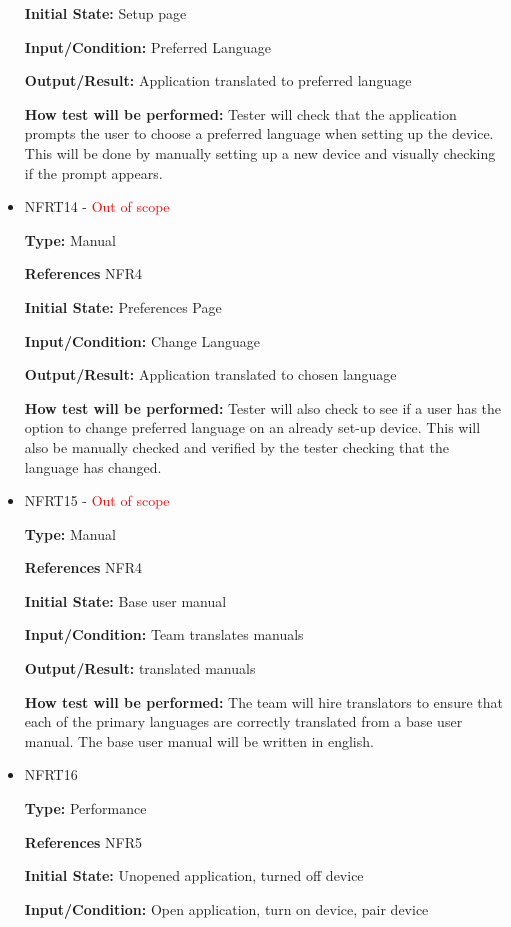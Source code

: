 \documentclass[12pt, titlepage]{article}
\begin{document}
\begin{itemize}
\textbf{Initial State:} Setup page
					
\textbf{Input/Condition:} Preferred Language
					
\textbf{Output/Result:} Application translated to preferred language
					
\textbf{How test will be performed:} Tester will check that the application prompts the user to choose a preferred language when setting up the device. This will be done by manually setting up a new device and visually checking if the prompt appears.

\item{NFRT14 - \textcolor{red}{Out of scope}}

\textbf{Type:} Manual

\textbf{References} NFR4
					
\textbf{Initial State:} Preferences Page
					
\textbf{Input/Condition:} Change Language
					
\textbf{Output/Result:} Application translated to chosen language
					
\textbf{How test will be performed:} Tester will also check to see if a user has the option to change preferred language on an already set-up device. This will also be manually checked and verified by the tester checking that the language has changed.

\item{NFRT15 - \textcolor{red}{Out of scope}} 

\textbf{Type:} Manual

\textbf{References} NFR4
					
\textbf{Initial State:} Base user manual  
					
\textbf{Input/Condition:} Team translates manuals
					
\textbf{Output/Result:} translated manuals
					
\textbf{How test will be performed:} The team will hire translators to ensure that each of the primary languages are correctly translated from a base user manual. The base user manual will be written in english.

\item{NFRT16}

\textbf{Type:} Performance

\textbf{References} NFR5
					
\textbf{Initial State:} Unopened application, turned off device
					
\textbf{Input/Condition:} Open application, turn on device, pair device
					

\end{itemize}
\end{document}
